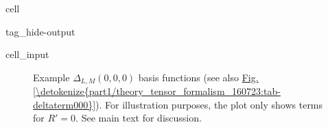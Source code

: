 \documentclass[letterpaper,table,10pt,english]{jupyterBook}
\begin{document}
\begin{sphinxuseclass}{cell}
\begin{sphinxuseclass}{tag_hide-output}
\begin{sphinxVerbatimInput}
\begin{sphinxuseclass}{cell_input}
\begin{sphinxVerbatim}[commandchars=\\\{\}]
  
   
\end{sphinxVerbatim}

\end{sphinxuseclass}\end{sphinxVerbatimInput}

\end{sphinxuseclass}
\end{sphinxuseclass}
\begin{figure}[htbp]
\centering
\capstart

\noindent{}
\caption{Example \(\Delta_{L,M}(0,0,0)\) basis functions (see also \hyperref[\detokenize{part1/theory_tensor_formalism_160723:tab-deltaterm000}]{Fig.\@ \ref{\detokenize{part1/theory_tensor_formalism_160723:tab-deltaterm000}}}). For illustration purposes, the plot only shows terms for \(R'=0\). See main text for discussion.}\label{\detokenize{part1/theory_tensor_formalism_160723:fig-deltaterm000}}\end{figure}
\end{document}

